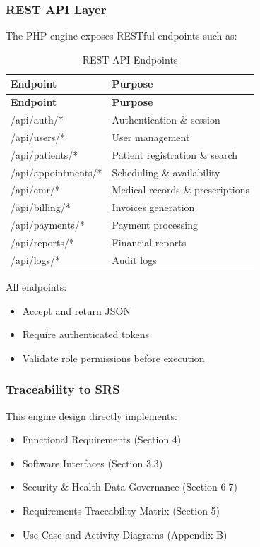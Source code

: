 \subsubsection{REST API Layer}
The PHP engine exposes RESTful endpoints such as:


\begin{longtable}{%
		p{} 
		p{}}
	
	\caption{REST API Endpoints}
	\label{tab:api-endpoints} \\
	
	\toprule
	\textbf{Endpoint} & \textbf{Purpose} \\
	\midrule
	\endfirsthead
	
	\toprule
	\textbf{Endpoint} & \textbf{Purpose} \\
	\midrule
	\endhead
	
	/api/auth/* & Authentication \& session \\[6pt]
	/api/users/* & User management \\[6pt]
	/api/patients/* & Patient registration \& search \\[6pt]
	/api/appointments/* & Scheduling \& availability \\[6pt]
	/api/emr/* & Medical records \& prescriptions \\[6pt]
	/api/billing/* & Invoices generation \\[6pt]
	/api/payments/* & Payment processing \\[6pt]
	/api/reports/* & Financial reports \\[6pt]
	/api/logs/* & Audit logs \\
	
	\bottomrule
\end{longtable}
All endpoints:
\begin{itemize}
	\item Accept and return JSON
	\item Require authenticated tokens
	\item Validate role permissions before execution
\end{itemize}

\subsubsection{Traceability to SRS}
This engine design directly implements:
\begin{itemize}
	\item Functional Requirements (Section 4)
	\item Software Interfaces (Section 3.3)
	\item Security \& Health Data Governance (Section 6.7)
	\item Requirements Traceability Matrix (Section 5)
	\item Use Case and Activity Diagrams (Appendix B)
\end{itemize}

